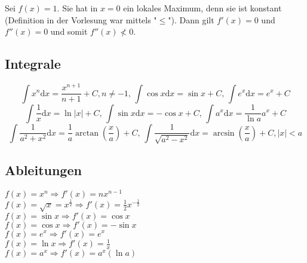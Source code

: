 \documentclass[10pt,a4paper^, twocolumn]{article}
\renewcommand{\d}{\mathrm{d}} %
\begin{document}
Sei $f(x) =1$. Sie hat in $x=0$ ein lokales Maximum, denn sie ist konstant (Definition in der Vorlesung war mittels "$\leq$"). Dann gilt $f'(x) = 0$ und $f''(x) = 0$ und somit $f''(x) \not< 0$.\\

\subsection{Integrale}

$$ \int x^n \d x = \frac{x^{n+1}}{n+1} + C, n \neq -1, \, \int \cos{x} \d x = \sin{x} + C, \, \int e^x \d x = e^x + C $$
$$ \int \frac{1}{x} \d x = \ln |x| + C, \, \int \sin{x} \d x = - \cos{x} + C, \, \int a^x \d x = \frac{1}{\ln{a}} a^x + C$$
$$ \int \frac{1}{a^2 + x^2} \d x = \frac{1}{a} \arctan{\left(\frac{x}{a}\right)} + C , \, \int \frac{1}{\sqrt{a^2-x^2}} \d x = \arcsin{\left(\frac{x}{a}\right)} + C, |x| < a $$

\subsection{Ableitungen}

$f(x) = x^n \Rightarrow f'(x) = nx^{n-1}$ \\
$f(x) = \sqrt{x} = x^{\frac{1}{2}} \Rightarrow f'(x) = \frac{1}{2}x^{-\frac{1}{2}}$\\
$f(x) = \sin{x} \Rightarrow f'(x) = \cos{x}$ \\
$f(x) = \cos{x} \Rightarrow f'(x) = - \sin{x}$ \\
$f(x) = e^x \Rightarrow f'(x) = e^x $ \\
$f(x) = \ln{x} \Rightarrow f'(x) = \frac{1}{x}$ \\
$f(x) = a^x \Rightarrow f'(x) = a^x (\ln{a})$\\
%
%
%
%
%
%
%
%
%
%
\end{document}
